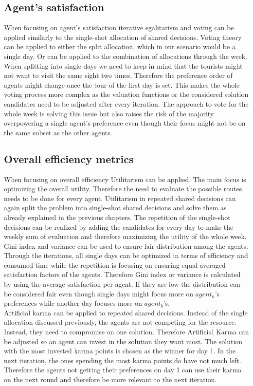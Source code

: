 \documentclass[german, a4paper, 11pt, oneside]{scrbook}
\begin{document}
\subsection{Agent's satisfaction}
When focusing on agent's satisfaction iterative egalitarism and voting can be applied similarly to the single-shot allocation of shared decisions. Voting theory can be applied to either the split allocation, which in our scenario would be a single day. Or can be applied to the combination of allocations through the week. When splitting into single days we need to keep in mind that the tourists might not want to visit the same sight two times. Therefore the preference order of agents might change once the tour of the first day is set. This makes the whole voting process more complex as the valuation functions or the considered solution candidates need to be adjusted after every iteration. The approach to vote for the whole week is solving this issue but also raises the risk of the majority overpowering a single agent's preference even though their focus might not be on the same subset as the other agents.
\subsection{Overall efficiency metrics}
When focusing on overall efficiency Utilitarism can be applied. The main focus is optimizing the overall utility. Therefore the need to evaluate the possible routes needs to be done for every agent. Utilitarism in repeated shared decisions can again split the problem into single-shot shared decisions and solve them as already explained in the previous chapters. The repetition of the single-shot decisions can be realized by adding the candidates for every day to make the weekly sum of evaluation and therefore maximizing the utility of the whole week. \\Gini index and variance can be used to ensure fair distribution among the agents. Through the iterations, all single days can be optimized in terms of efficiency and consumed time while the repetition is focusing on ensuring equal averaged satisfaction factors of the agents. Therefore Gini index or variance is calculated by using the average satisfaction per agent. If they are low the distribution can be considered fair even though single days might focus more on $agent_a$'s preferences while another day focuses more on $agent_ b$'s.
\\Artificial karma can be applied to repeated shared decisions. Instead of the single allocation discussed previously, the agents are not competing for the resource. Instead, they need to compromise on one solution. Therefore Artificial Karma can be adjusted so an agent can invest in the solution they want most. The solution with the most invested karma points is chosen as the winner for day 1. In the next iteration, the ones spending the most karma points do have not much left. Therefore the agents not getting their preferences on day 1 can use their karma on the next round and therefore be more relevant to the next iteration. 
\end{document}
